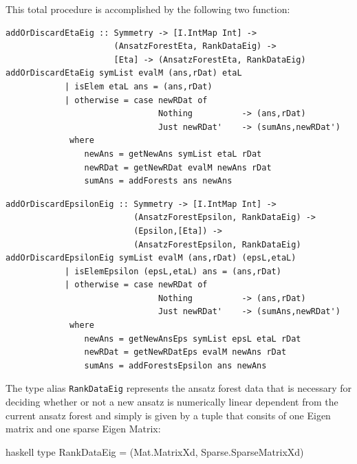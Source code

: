\documentclass[a4paper,12pt, DIV=14, BCOR=5mm, twoside, headsepline]{scrbook}
\begin{document}
This total procedure is accomplished by the following two function:

\begin{samepage}
\begin{verbatim}
addOrDiscardEtaEig :: Symmetry -> [I.IntMap Int] ->
                      (AnsatzForestEta, RankDataEig) -> 
                      [Eta] -> (AnsatzForestEta, RankDataEig)
addOrDiscardEtaEig symList evalM (ans,rDat) etaL
            | isElem etaL ans = (ans,rDat)
            | otherwise = case newRDat of
                               Nothing          -> (ans,rDat)
                               Just newRDat'    -> (sumAns,newRDat')
             where
                newAns = getNewAns symList etaL rDat
                newRDat = getNewRDat evalM newAns rDat
                sumAns = addForests ans newAns
\end{verbatim} 
\end{samepage}

\begin{samepage}
\begin{verbatim}
addOrDiscardEpsilonEig :: Symmetry -> [I.IntMap Int] ->
                          (AnsatzForestEpsilon, RankDataEig) ->
                          (Epsilon,[Eta]) ->
                          (AnsatzForestEpsilon, RankDataEig)
addOrDiscardEpsilonEig symList evalM (ans,rDat) (epsL,etaL)
            | isElemEpsilon (epsL,etaL) ans = (ans,rDat)
            | otherwise = case newRDat of
                               Nothing          -> (ans,rDat)
                               Just newRDat'    -> (sumAns,newRDat')
             where
                newAns = getNewAnsEps symList epsL etaL rDat
                newRDat = getNewRDatEps evalM newAns rDat
                sumAns = addForestsEpsilon ans newAns
\end{verbatim} 
\end{samepage}

The type alias \texttt{RankDataEig} represents the ansatz forest data that is necessary for deciding whether or not a new ansatz is numerically linear dependent from the current ansatz forest and simply is given by a tuple that consits of one Eigen matrix and one sparse Eigen Matrix:

\begin{center}
\begin{cminted}{haskell}
type RankDataEig = (Mat.MatrixXd, Sparse.SparseMatrixXd)
\end{cminted}
\end{center}
\end{document}
